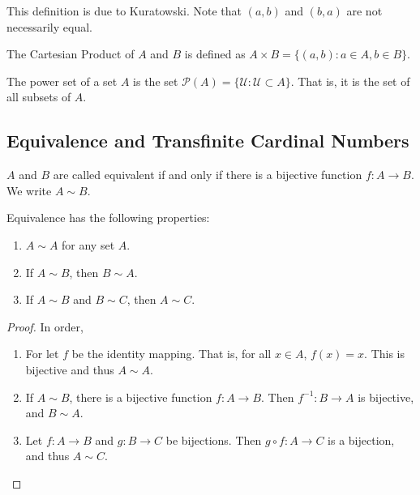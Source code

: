 \documentclass[crop=false,class=book,oneside]{standalone}
\begin{document}
            \begin{remark}
            This definition is due to Kuratowski. Note that $(a,b)$ and $(b,a)$ are not necessarily equal.
            \end{remark}
            \begin{definition}
            The Cartesian Product of $A$ and $B$ is defined as $A\times B = \{(a,b):a\in A, b\in B\}$.
            \end{definition}
            \begin{definition}
            The power set of a set $A$ is the set $\mathcal{P}(A) = \{\mathcal{U}:\mathcal{U}\subset A\}$. That is, it is the set of all subsets of $A$.
            \end{definition}
        \subsection{Equivalence and Transfinite Cardinal Numbers}
            \begin{definition}
            $A$ and $B$ are called equivalent if and only if there is a bijective function $f:A\rightarrow B$. We write $A\sim B$.
            \end{definition}
            \begin{theorem}
            Equivalence has the following properties:
            \begin{enumerate}
            \item $A\sim A$ for any set $A$.
            \item If $A\sim B$, then $B\sim A$.
            \item If $A\sim B$ and $B\sim C$, then $A\sim C$.
            \end{enumerate}
            \end{theorem}
            \begin{proof}
            In order,
            \begin{enumerate}
            \item For let $f$ be the identity mapping. That is, for all $x\in A$, $f(x) = x$. This is bijective and thus $A\sim A$.
            \item If $A\sim B$, there is a bijective function $f:A\rightarrow B$. Then $f^{-1}:B\rightarrow A$ is bijective, and $B\sim A$.
            \item Let $f:A\rightarrow B$ and $g:B\rightarrow C$ be bijections. Then $g\circ f:A\rightarrow C$ is a bijection, and thus $A\sim C$.
            \end{enumerate}
            \end{proof}
\end{document}
